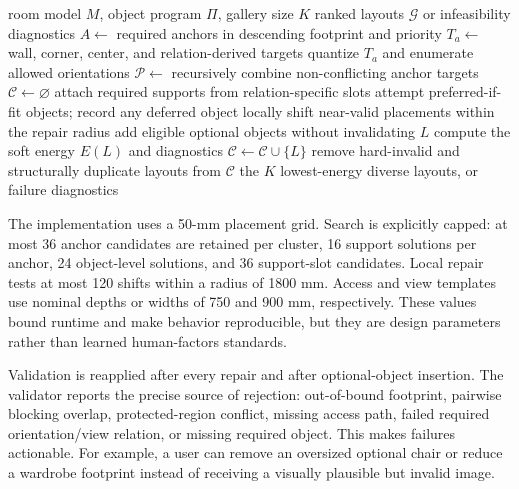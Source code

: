 \documentclass[pdflatex,sn-mathphys-num]{sn-jnl}
\begin{document}
\begin{algorithm}[!t]
  \caption{Anchor-first search with hard validation}\label{alg:solver}
  \begin{algorithmic}[1]
    \Require room model \(M\), object program \(\Pi\), gallery size \(K\)
    \Ensure ranked layouts \(\mathcal{G}\) or infeasibility diagnostics
    \State \(A \gets\) required anchors in descending footprint and priority
      \State \(T_a \gets\) wall, corner, center, and relation-derived targets
      \State quantize \(T_a\) and enumerate allowed orientations
    \EndFor
    \State \(\mathcal{P}\gets\) recursively combine non-conflicting anchor targets
    \State \(\mathcal{C}\gets\varnothing\)
      \State attach required supports from relation-specific slots
      \State attempt preferred-if-fit objects; record any deferred object
      \State locally shift near-valid placements within the repair radius
        \State add eligible optional objects without invalidating \(L\)
        \State compute the soft energy \(E(L)\) and diagnostics
        \State \(\mathcal{C}\gets\mathcal{C}\cup\{L\}\)
      \EndIf
    \EndFor
    \State remove hard-invalid and structurally duplicate layouts from \(\mathcal{C}\)
    \State \Return the \(K\) lowest-energy diverse layouts, or failure diagnostics
  \end{algorithmic}
\end{algorithm}

The implementation uses a 50-mm placement grid. Search is explicitly capped: at most 36 anchor candidates are retained per cluster, 16 support solutions per anchor, 24 object-level solutions, and 36 support-slot candidates. Local repair tests at most 120 shifts within a radius of 1800 mm. Access and view templates use nominal depths or widths of 750 and 900 mm, respectively. These values bound runtime and make behavior reproducible, but they are design parameters rather than learned human-factors standards.

Validation is reapplied after every repair and after optional-object insertion. The validator reports the precise source of rejection: out-of-bound footprint, pairwise blocking overlap, protected-region conflict, missing access path, failed required orientation/view relation, or missing required object. This makes failures actionable. For example, a user can remove an oversized optional chair or reduce a wardrobe footprint instead of receiving a visually plausible but invalid image.
\end{document}
